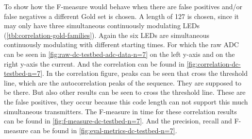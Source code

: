 To show how the F-measure would behave when there are false positives and/or false negatives a different Gold set is chosen.
A length of 127 is chosen, since it may only have three simultaneous continuously modulating LEDs (\autoref{tbl:correlation-gold-families}).
Again the six LEDs are simultaneous continuously modulating with different starting times.
For which the raw ADC can be seen in \autoref{fig:raw-dc-testbed-adc-data-n=7} on the left y-axis and on the right y-axis the current.
And the correlation can be found in \autoref{fig:correlation-dc-testbed-n=7}.
In the correlation figure, peaks can be seen that cross the threshold line, which are the autocorrelation peaks of the sequence.
They are supposed to be there.
But also other results can be seen to cross the threshold line.
These are the false positives, they occur because this code length can not support this much simultaneous transmitters.
The F-measure in time for these correlation results can be found in \autoref{fig:f-measure-dc-testbed-n=7}.
And the precision, recall and F-measure can be found in \autoref{fig:eval-metrics-dc-testbed-n=7}.


